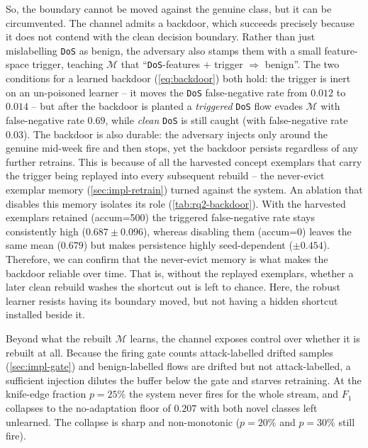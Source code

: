 So, the boundary cannot be moved against the genuine class, but it can be circumvented. The channel admits a backdoor, which succeeds precisely because it does not contend with the clean decision boundary. Rather than just mislabelling \texttt{DoS} as benign, the adversary also stamps them with a small feature-space trigger, teaching $\mathcal{M}$ that ``\texttt{DoS}-features $+$ trigger $\Rightarrow$ benign''. The two conditions for a learned backdoor (\cref{eq:backdoor}) both hold: the trigger is inert on an un-poisoned learner -- it moves the \texttt{DoS} false-negative rate from $0.012$ to $0.014$ -- but after the backdoor is planted a \emph{triggered} \texttt{DoS} flow evades $\mathcal{M}$ with false-negative rate $0.69$, while \emph{clean} \texttt{DoS} is still caught (with false-negative rate $0.03$). The backdoor is also durable: the adversary injects only around the genuine mid-week fire and then stops, yet the backdoor persists regardless of any further retrains. This is because of all the harvested concept exemplars that carry the trigger being replayed into every subsequent rebuild -- the never-evict exemplar memory (\cref{sec:impl-retrain}) turned against the system. An ablation that disables this memory isolates its role (\cref{tab:rq2-backdoor}). With the harvested exemplars retained (accum=500) the triggered false-negative rate stays consistently high ($0.687 \pm 0.096$), whereas disabling them (accum=0) leaves the same mean ($0.679$) but makes persistence highly seed-dependent ($\pm 0.454$). Therefore, we can confirm that the never-evict memory is what makes the backdoor reliable over time. That is, without the replayed exemplars, whether a later clean rebuild washes the shortcut out is left to chance. Here, the robust learner resists having its boundary moved, but not having a hidden shortcut installed beside it.



Beyond what the rebuilt $\mathcal{M}$ learns, the channel exposes control over whether it is rebuilt at all. Because the firing gate counts attack-labelled drifted samples (\cref{sec:impl-gate}) and benign-labelled flows are drifted but not attack-labelled, a sufficient injection dilutes the buffer below the gate and starves retraining. At the knife-edge fraction $p = 25\%$ the system never fires for the whole stream, and $F_1$ collapses to the no-adaptation floor of $0.207$ with both novel classes left unlearned. The collapse is sharp and non-monotonic ($p = 20\%$ and $p = 30\%$ still fire).

